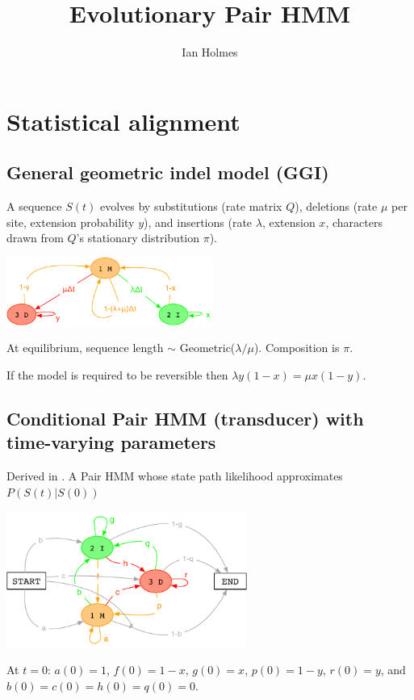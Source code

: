 \documentclass{article}
\title{Evolutionary Pair HMM}
\author{Ian Holmes}
\begin{document}

\section{Statistical alignment}

\subsection{General geometric indel model (GGI)}

A sequence $S(t)$ evolves by
substitutions (rate matrix $Q$),
deletions (rate $\mu$ per site, extension probability $y$),
and
insertions (rate $\lambda$, extension $x$,
characters drawn from $Q$'s stationary distribution $\pi$).

\includegraphics[height=6em]{InstantHMM.pdf}

At equilibrium, sequence length $\sim$ Geometric($\lambda/\mu$). Composition is $\pi$.

If the model is required to be reversible then $\lambda y(1-x) = \mu x(1-y)$.

\subsection{Conditional Pair HMM (transducer) with time-varying parameters}
Derived in \cite{Holmes2020}.
A Pair HMM whose state path likelihood approximates $P(S(t)|S(0))$

\includegraphics[height=12em]{PairHMM.pdf}

At $t=0$: $a(0)=1$, $f(0)=1-x$, $g(0)=x$, $p(0)=1-y$, $r(0)=y$, and $b(0)=c(0)=h(0)=q(0)=0$.
\end{document}
